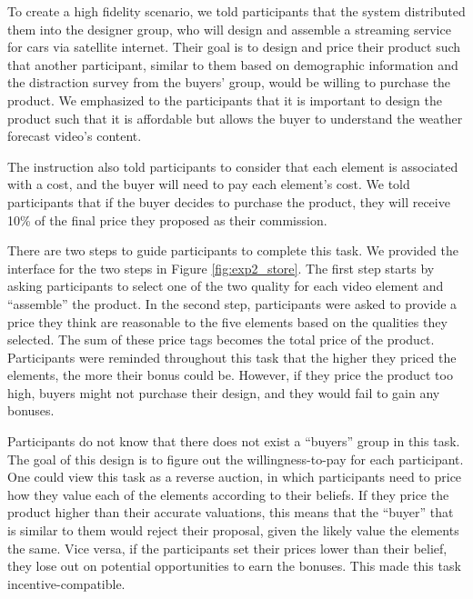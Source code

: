 To create a high fidelity scenario, we told participants that the system distributed them into the designer group, who will design and assemble a streaming service for cars via satellite internet. Their goal is to design and price their product such that another participant, similar to them based on demographic information and the distraction survey from the buyers' group, would be willing to purchase the product. We emphasized to the participants that it is important to design the product such that it is affordable but allows the buyer to understand the weather forecast video's content.

The instruction also told participants to consider that each element is associated with a cost, and the buyer will need to pay each element's cost. We told participants that if the buyer decides to purchase the product, they will receive 10\% of the final price they proposed as their commission. 

There are two steps to guide participants to complete this task. We provided the interface for the two steps in Figure \ref{fig:exp2_store}. The first step starts by asking participants to select one of the two quality for each video element and ``assemble'' the product. In the second step, participants were asked to provide a price they think are reasonable to the five elements based on the qualities they selected. The sum of these price tags becomes the total price of the product. Participants were reminded throughout this task that the higher they priced the elements, the more their bonus could be. However, if they price the product too high, buyers might not purchase their design, and they would fail to gain any bonuses. 

Participants do not know that there does not exist a ``buyers'' group in this task. The goal of this design is to figure out the willingness-to-pay for each participant. One could view this task as a reverse auction, in which participants need to price how they value each of the elements according to their beliefs. If they price the product higher than their accurate valuations, this means that the ``buyer'' that is similar to them would reject their proposal, given the likely value the elements the same. Vice versa, if the participants set their prices lower than their belief, they lose out on potential opportunities to earn the bonuses. This made this task incentive-compatible. 


